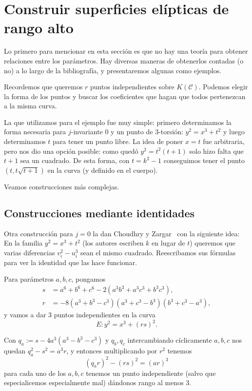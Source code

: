 \documentclass[a4paper]{book}
\theoremstyle{definition}
\theoremstyle{plain}
\newcommand{\cc}{\mathcal{C}}
\begin{document}
\section{Construir superficies elípticas de rango alto}\label{sec:construirRangoAlto}

Lo primero para mencionar en esta sección es que no hay una teoría para obtener relaciones entre los parámetros. Hay diversas maneras de obtenerlos contadas (o no) a lo largo de la bibliografía, y presentaremos algunas como ejemplos.

Recordemos que queremos $r$ puntos independientes sobre $K(\cc)$. Podemos elegir la forma de los puntos y buscar los coeficientes que hagan que todos pertenezcan a la misma curva.

La que utilizamos para el ejemplo fue muy simple: primero determinamos la forma necesaria para $j$-invariante 0 y un punto de 3-torsión: $y^2 = x^3+t^2$ y luego determinamos $t$ para tener un punto libre. La idea de poner $x=t$ fue arbitraria, pero nos dio una opción posible: como quedó $y^2=t^2(t+1)$ solo hizo falta que $t+1$ sea un cuadrado. De esta forma, con $t=k^2-1$ conseguimos tener el punto $(t,t\sqrt{t+1})$ en la curva (y definido en el cuerpo). 

Veamos construcciones más complejas.

\subsection{Construcciones mediante identidades}

Otra construcción para $j=0$ la dan Choudhry y Zargar~\cite{ChoudhryZargar2016} con la siguiente idea: En la familia $y^2=x^3+t^2$ (los autores escriben $k$ en lugar de $t$) queremos que varias diferencias $v_i^2-u_i^3$ sean el mismo cuadrado. Reescribamos sus fórmulas para ver la identidad que las hace funcionar.

Para parámetros $a,b,c$, pongamos
\[
\begin{aligned}
s&=a^6+b^6+c^6-2(a^3b^3+a^3c^3+b^3c^3),\\
r&=-8(a^3+b^3-c^3)(a^3+c^3-b^3)(b^3+c^3-a^3),
\end{aligned}
\]
y vamos a dar 3 puntos independientes en la curva 
\[
E:y^2=x^3+{(rs)}^2.
\]

Con $q_a := s-4a^3(a^3-b^3-c^3)$ y $q_b,q_c$ intercambiando cíclicamente $a,b,c$ nos quedan $q_a^2-s^2=a^3r$, y entonces multiplicando por $r^2$ tenemos 
\[
{(q_a r)}^2-{(rs)}^2={(ar)}^3
\]
para cada uno de los $a, b, c$ tenemos un punto independiente (salvo que especialicemos especialmente mal) dándonos rango al menos 3.
\end{document}
